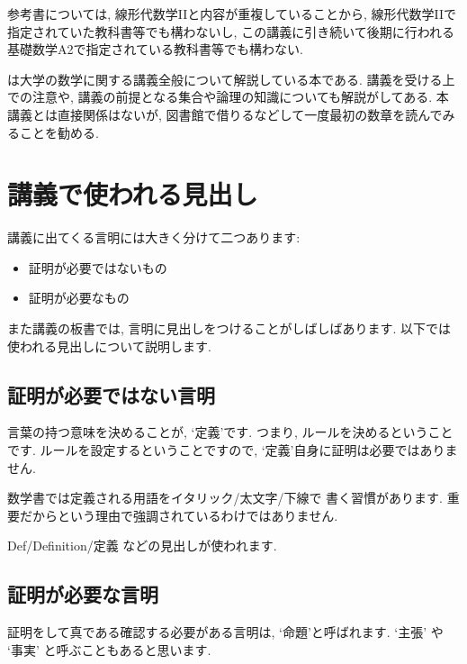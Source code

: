 参考書については,
線形代数学IIと内容が重複していることから,
線形代数学IIで指定されていた教科書等でも構わないし,
この講義に引き続いて後期に行われる
基礎数学A2で指定されている教科書等でも構わない.



\cite{978-4-535-78682-0}は大学の数学に関する講義全般について解説している本である.
講義を受ける上での注意や,
講義の前提となる集合や論理の知識についても解説がしてある.
本講義とは直接関係はないが,
図書館で借りるなどして一度最初の数章を読んでみることを勧める.

\section{講義で使われる見出し}
講義に出てくる言明には大きく分けて二つあります:
\begin{itemize}
 \item 証明が必要ではないもの
 \item 証明が必要なもの
\end{itemize}
また講義の板書では,
言明に見出しをつけることがしばしばあります.
以下では使われる見出しについて説明します.
\subsection{証明が必要ではない言明}
言葉の持つ意味を決めることが,
`定義'です.
つまり, ルールを決めるということです.
ルールを設定するということですので,
`定義'自身に証明は必要ではありません.

数学書では定義される用語をイタリック/太文字/下線で
書く習慣があります.
重要だからという理由で強調されているわけではありません.

Def/Definition/定義 などの見出しが使われます.

\subsection{証明が必要な言明}
証明をして真である確認する必要がある言明は,
`命題'と呼ばれます.
`主張' や `事実' と呼ぶこともあると思います.

